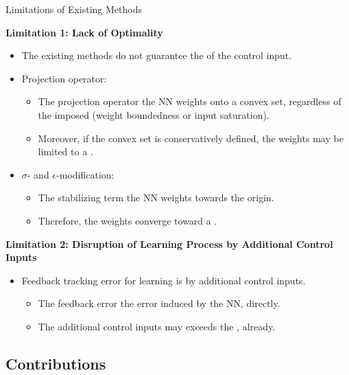 \documentclass[8pt, aspectratio=169]{beamer}
\newcommand{\ctxt}[2]{\color{#1}{#2}\color{black} }
\begin{document}
\begin{frame}{\insertsubsectionhead}{Limitations of Existing Methods}

  {
    \textbf{Limitation 1: Lack of Optimality}
  }
  \begin{itemize}
    \item<2-> The existing methods do not guarantee the \ctxt{airforceblue}{optimality } of the control input.
    \item<3-> Projection operator:
    \begin{itemize}
      \item The projection operator \ctxt{awesome}{simply projects } the NN weights onto a convex set, regardless of the imposed \ctxt{airforceblue}{constraints } (\eg weight boundedness or input saturation).
      \item Moreover, if the convex set is conservatively defined, the weights may be limited to a \ctxt{awesome}{suboptimal region}.
    \end{itemize}
    \item<4-> $\sigma$- and $\epsilon$-modification:
    \begin{itemize}
      \item The stabilizing term \ctxt{awesome}{biases } the NN weights towards the origin.
      \item Therefore, the weights converge toward a \ctxt{awesome}{suboptimal point}.
    \end{itemize}
  \end{itemize}

  {
    \textbf{Limitation 2: Disruption of Learning Process by Additional Control Inputs}
  }
  \begin{itemize}
    \item<5-> Feedback tracking error for learning is \ctxt{awesome}{disrupted } by additional control inputs.
      \begin{itemize}
        \item The feedback error \ctxt{airforceblue}{does not reflect } the error induced by the NN, directly.
        \item The additional control inputs may exceeds the \ctxt{awesome}{input saturation limits }, already.
    \end{itemize}  
  \end{itemize}

\end{frame}

\subsection{Contributions}
\end{document}
